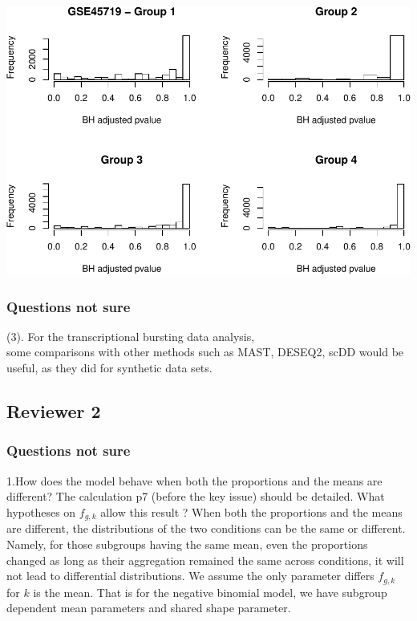 \documentclass[]{article}
\begin{document}
\includegraphics{Revision_files/figure-latex/unnamed-chunk-1-2.pdf}

\subsubsection{Questions not sure}\label{questions-not-sure}

(3). For the transcriptional bursting data analysis,\\
some comparisons with other methods such as MAST, DESEQ2, scDD would be
useful, as they did for synthetic data sets.

\subsection{Reviewer 2}\label{reviewer-2}

\subsubsection{Questions not sure}\label{questions-not-sure-1}

1.How does the model behave when both the proportions and the means are
different? The calculation p7 (before the key issue) should be detailed.
What hypotheses on \(f_{g,k}\) allow this result ? When both the
proportions and the means are different, the distributions of the two
conditions can be the same or different. Namely, for those subgroups
having the same mean, even the proportions changed as long as their
aggregation remained the same across conditions, it will not lead to
differential distributions. We assume the only parameter differs
\(f_{g,k}\) for \(k\) is the mean. That is for the negative binomial
model, we have subgroup dependent mean parameters and shared shape
parameter.
\end{document}
